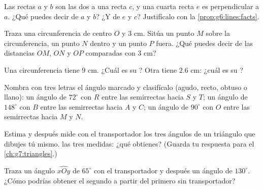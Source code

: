 \begin{exercise}[$\star$]\label{exo:g6:lines:4}
Las rectas $a$ y $b$ son las dos  a una recta $c$, y una cuarta
recta $e$ es perpendicular a $a$. ¿Qué puedes decir de $a$ y $b$?
¿Y de $e$ y $c$? Justifícalo con la \cref{prop:g6:lines:facts}.
\end{exercise}

\begin{exercise}[$\star$]\label{exo:g6:lines:5}
Traza una circunferencia de centro $O$ y  $3$ cm. Sitúa un punto $M$ sobre
la circunferencia, un punto $N$ dentro y un punto $P$ fuera. ¿Qué puedes decir
de las distancias $OM$, $ON$ y $OP$ comparadas con $3$ cm?
\end{exercise}

\begin{exercise}[$\star$]\label{exo:g6:lines:6}
Una circunferencia tiene  $9$ cm. ¿Cuál es su ? Otra tiene 
$2.6$ cm: ¿cuál es su ?
\end{exercise}

\begin{exercise}[$\star$]\label{exo:g6:lines:7}
Nombra con tres letras el ángulo marcado y clasifícalo (agudo, recto,
obtuso o llano): un ángulo de $72^\circ$ con  $R$ entre las semirrectas
hacia $S$ y $T$; un ángulo de $148^\circ$ con  $B$ entre las semirrectas
hacia $A$ y $C$; un ángulo de $90^\circ$ con  $O$ entre las semirrectas
hacia $M$ y $N$.
\end{exercise}

\begin{exercise}[$\star$]\label{exo:g6:lines:8}
Estima y después mide con el transportador los tres ángulos de un
triángulo que dibujes tú mismo.  las tres medidas: ¿qué obtienes?
(Guarda tu respuesta para el \cref{ch:g7:triangles}.)
\end{exercise}

\begin{exercise}[$\star$]\label{exo:g6:lines:9}
Traza un ángulo $\widehat{xOy}$ de $65^\circ$ con el transportador y después un
ángulo de $130^\circ$. ¿Cómo podrías obtener el segundo a partir del primero
sin transportador?
\end{exercise}

